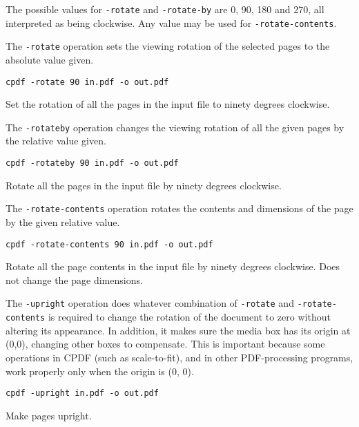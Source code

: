 \documentclass{book}
\begin{document}
  The possible values for \texttt{-rotate} and \texttt{-rotate-by} are 0, 90,
180 and 270, all interpreted as being clockwise. Any value may be used for
\texttt{-rotate-contents}.
  
The \texttt{-rotate} operation sets the viewing rotation of the selected pages to
the absolute value given.
  \begin{framed}
  \small\verb!cpdf -rotate 90 in.pdf -o out.pdf!

  \vspace{2.5mm}
  \noindent Set the rotation of all the pages in the input file to ninety degrees clockwise.
  \end{framed}
  \noindent The \texttt{-rotateby} operation changes the viewing rotation of all the
given pages by the relative value given.
  \begin{framed}
  \small\verb!cpdf -rotateby 90 in.pdf -o out.pdf!

  \vspace{2.5mm}
  \noindent Rotate all the pages in the input file by ninety degrees clockwise.
  \end{framed}
  \noindent The \texttt{-rotate-contents} operation rotates the contents and dimensions
of the page by the given relative value.
  \begin{framed}
  \small\verb!cpdf -rotate-contents 90 in.pdf -o out.pdf!

  \vspace{2.5mm}

  \noindent Rotate all the page contents in the input file by
ninety degrees clockwise. Does not change the page dimensions.
  \end{framed}

  \label{upright}
   \noindent The \texttt{-upright} operation does whatever combination of
\texttt{-rotate} and \texttt{-rotate-contents} is required to change the
rotation of the document to zero without altering its appearance. In addition, it makes sure the media box has its origin at (0,0), changing other boxes to compensate. This is important because some operations in CPDF (such as scale-to-fit), and in other PDF-processing programs, work properly only when the origin is (0, 0).

  \begin{framed}
  \small\verb!cpdf -upright in.pdf -o out.pdf!

  \vspace{2.5mm}

  \noindent Make pages upright.
  \end{framed}
\end{document}
